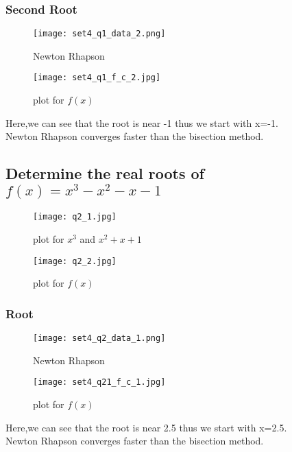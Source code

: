 \documentclass[a4paper]{article}
\begin{document}
        \subsubsection{Second Root}
            \begin{figure}[!htbp]
              \centering
              \begin{minipage}[b]{0.45\textwidth}
\texttt{[image: set4\_q1\_data\_2.png]}
                \caption{Newton Rhapson }
              \end{minipage}
              \hfill
              \begin{minipage}[b]{0.45\textwidth}
    \texttt{[image: set4\_q1\_f\_c\_2.jpg]}
                \caption{plot for $f(x)$}
              \end{minipage}
            \end{figure}
            \Large{Here,we can see that the root is near -1 thus we start with x=-1.\\Newton Rhapson converges faster than the bisection method.}
            \newpage
            
         \subsection{Determine the real roots of $f(x) = x^3- x^2 − x − 1$}
            \begin{figure}[!htbp]
              \centering
              \begin{minipage}[b]{0.45\textwidth}
                \texttt{[image: q2\_1.jpg]}
                \caption{plot for $x^3$ and $x^2+x+1$ }
              \end{minipage}
              \hfill
              \begin{minipage}[b]{0.45\textwidth}
                \texttt{[image: q2\_2.jpg]}
                \caption{plot for $f(x)$}
              \end{minipage}
            \end{figure}
        \subsubsection{Root}
            \begin{figure}[!htbp]
              \centering
              \begin{minipage}[b]{0.45\textwidth}
\texttt{[image: set4\_q2\_data\_1.png]}
                \caption{Newton Rhapson }
              \end{minipage}
              \hfill
              \begin{minipage}[b]{0.45\textwidth}
\texttt{[image: set4\_q21\_f\_c\_1.jpg]}
                \caption{plot for $f(x)$}
              \end{minipage}
            \end{figure}
            \Large{Here,we can see that the root is near 2.5 thus we start with x=2.5.\\Newton Rhapson converges faster than the bisection method.}
        \newpage
        
\end{document}

